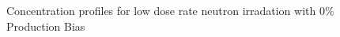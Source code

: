 \documentclass[a4paper]{article}
\begin{document}
    \begin{figure}[h!]  %
      \centering
      \qquad
      \caption{Concentration profiles for low dose rate neutron irradation with 0\% Production Bias}
      \label{figure:concentrations_neutron_0_1e-6}
    \end{figure}
\end{document}
